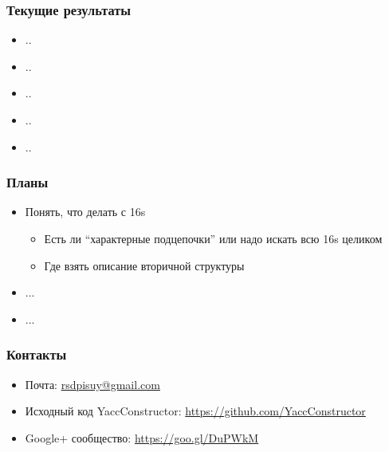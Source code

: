 \documentclass{beamer}
\begin{document}
\begin{frame}
  \transwipe[direction=90]
  \frametitle{Текущие результаты}
  \begin{itemize}
    \item ..
    \item ..
    \item ..
    \item ..
    \item ..
  \end{itemize}
\end{frame}

\begin{frame}
  \transwipe[direction=90]
  \frametitle{Планы}
  \begin{itemize}
    \item Понять, что делать с 16s
      \begin{itemize}
        \item Есть ли ``характерные подцепочки'' или надо искать всю 16s целиком
        \item Где взять описание вторичной структуры
      \end{itemize}
    \item ...
    \item ...
  \end{itemize}
\end{frame}
          
\begin{frame}
\transwipe[direction=90]
\frametitle{Контакты}
\begin{itemize}
  \item Почта: \url{rsdpisuy@gmail.com}
  \item Исходный код YaccConstructor: \url{https://github.com/YaccConstructor}
  \item Google+ сообщество: \url{https://goo.gl/DuPWkM}
\end{itemize}
\end{frame}
\end{document}
